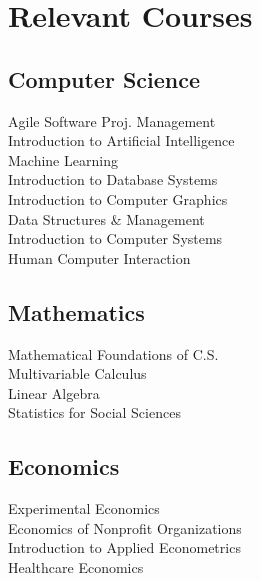 
\section{Relevant Courses}
\subsection{Computer Science}
Agile Software Proj. Management\\
Introduction to Artificial Intelligence\\
Machine Learning\\
Introduction to Database Systems\\
Introduction to Computer Graphics\\
Data Structures \& Management\\
Introduction to Computer Systems\\
Human Computer Interaction\\
\sectionsep

\subsection{Mathematics}
Mathematical Foundations of C.S.\\
Multivariable Calculus\\
Linear Algebra\\
Statistics for Social Sciences\\
\sectionsep

\subsection{Economics}
Experimental Economics\\
Economics of Nonprofit Organizations\\
Introduction to Applied Econometrics\\
Healthcare Economics\\
\sectionsep
